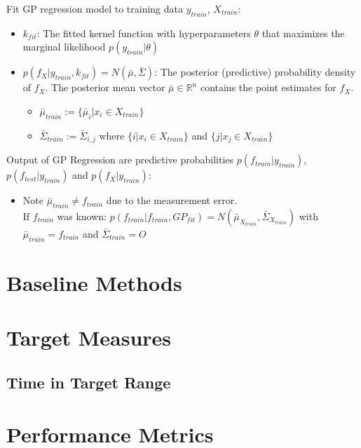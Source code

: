 	Fit GP regression model to training data $y_{train}$, $X_{train}$:
    \begin{itemize}
        \item $k_{fit}$: The fitted kernel function with hyperparameters $\theta$ that maximizes the marginal likelihood
        $p(y_{train}| \theta)$
        \item $p(f_X| y_{train}, k_{fit}) = N(\bar{\mu}, \bar{\Sigma})$:
        The posterior (predictive) probability density of $f_X$. The posterior mean vector
        $\bar{\mu} \in \mathbb{R}^n$ contains the point estimates for $f_X$.
        \begin{itemize}
            \item $\bar{\mu}_{train} := \{\bar{\mu}_i | x_i \in X_{train}\}$
            \item $\bar{\Sigma}_{train} := \bar{\Sigma}_{i,j}$ where $\{i | x_i \in X_{train}\}$ and $\{j | x_j \in X_{train}\}$

        \end{itemize}
    \end{itemize}

	Output of GP Regression are predictive probabilities $p(f_{train}| y_{train})$,
		$p(f_{test}| y_{train})$ and $p(f_{X}| y_{train})$:
			\begin{itemize}
				\item Note $\bar{\mu}_{train} \neq f_{train}$ due to the measurement error. \\ If
				$f_{train}$ was known: $p(f_{train}| f_{train}, GP_{fit}) = N(\bar{\mu}_{X_{train}},
				\bar{\Sigma}_{X_{train}})$
				with $\bar{\mu}_{train} = f_{train}$ and $\bar{\Sigma}_{train} = {\displaystyle O}$
			\end{itemize}



\section{Baseline Methods}\label{sec:baseline-methods}


\section{Target Measures}\label{sec:target-measures}

\subsection{Time in Target Range}




\section{Performance Metrics}\label{sec:performance-metric}




















